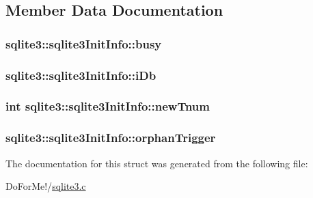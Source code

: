 \subsection{Member Data Documentation}
\hypertarget{structsqlite3_1_1sqlite3_init_info_a6ac01842e0ae68023cb60fea93bd8688}{
\subsubsection[{busy}]{ sqlite3\-::sqlite3\-Init\-Info\-::busy}}\label{structsqlite3_1_1sqlite3_init_info_a6ac01842e0ae68023cb60fea93bd8688}
\hypertarget{structsqlite3_1_1sqlite3_init_info_af72389cb54753544c0f578605e6604bb}{
\subsubsection[{i\-Db}]{ sqlite3\-::sqlite3\-Init\-Info\-::i\-Db}}\label{structsqlite3_1_1sqlite3_init_info_af72389cb54753544c0f578605e6604bb}
\hypertarget{structsqlite3_1_1sqlite3_init_info_a65250c8c5f215989e64294ede6c1c268}{
\subsubsection[{new\-Tnum}]{\setlength{\rightskip}{0pt plus 5cm}int sqlite3\-::sqlite3\-Init\-Info\-::new\-Tnum}}\label{structsqlite3_1_1sqlite3_init_info_a65250c8c5f215989e64294ede6c1c268}
\hypertarget{structsqlite3_1_1sqlite3_init_info_ac292839cc81d109206133a80949c45a6}{
\subsubsection[{orphan\-Trigger}]{ sqlite3\-::sqlite3\-Init\-Info\-::orphan\-Trigger}}\label{structsqlite3_1_1sqlite3_init_info_ac292839cc81d109206133a80949c45a6}


The documentation for this struct was generated from the following file\-:\begin{DoxyCompactItemize}
\item 
Do\-For\-Me!/\hyperlink{sqlite3_8c}{sqlite3.\-c}\end{DoxyCompactItemize}
